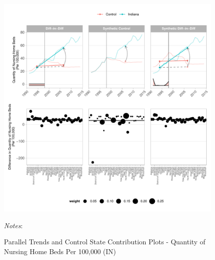 \documentclass[12pt]{article}
\begin{document}
\newpage
\begin{figure}[t]
	\begin{center}
	\caption{\centering Parallel Trends and Control State Contribution Plots - Quantity of Nursing Home Beds Per 100,000 (IN)}
    \includegraphics[width=\textwidth,keepaspectratio]{q_nursing_home_beds_plots_IN.pdf}
    \end{center}
    \footnotesize
		\textit{Notes}:
\end{figure}
\clearpage
\end{document}
